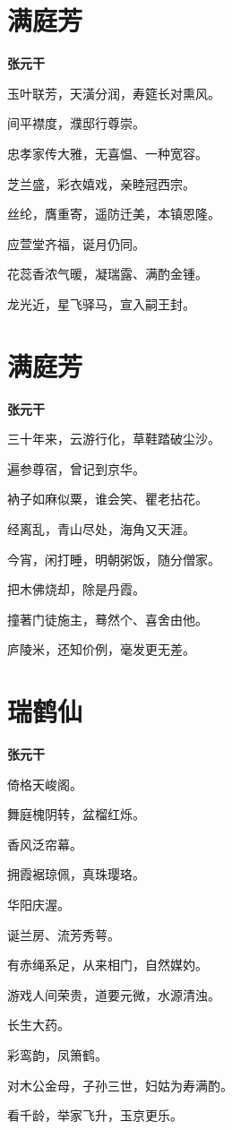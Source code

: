 \documentclass[12pt,a4paper]{ctexbook}
\begin{document}
\section{满庭芳}
\textbf{张元干}\par\vspace{0.5em}
玉叶联芳，天潢分润，寿筵长对熏风。\par
间平襟度，濮邸行尊崇。\par
忠孝家传大雅，无喜愠、一种宽容。\par
芝兰盛，彩衣嬉戏，亲睦冠西宗。\par
丝纶，膺重寄，遥防迁美，本镇恩隆。\par
应萱堂齐福，诞月仍同。\par
花蕊香浓气暖，凝瑞露、满酌金锺。\par
龙光近，星飞驿马，宣入嗣王封。\par

\section{满庭芳}
\textbf{张元干}\par\vspace{0.5em}
三十年来，云游行化，草鞋踏破尘沙。\par
遍参尊宿，曾记到京华。\par
衲子如麻似粟，谁会笑、瞿老拈花。\par
经离乱，青山尽处，海角又天涯。\par
今宵，闲打睡，明朝粥饭，随分僧家。\par
把木佛烧却，除是丹霞。\par
撞著门徒施主，蓦然个、喜舍由他。\par
庐陵米，还知价例，毫发更无差。\par

\section{瑞鹤仙}
\textbf{张元干}\par\vspace{0.5em}
倚格天峻阁。\par
舞庭槐阴转，盆榴红烁。\par
香风泛帘幕。\par
拥霞裾琼佩，真珠璎珞。\par
华阳庆渥。\par
诞兰房、流芳秀萼。\par
有赤绳系足，从来相门，自然媒妁。\par
游戏人间荣贵，道要元微，水源清浊。\par
长生大药。\par
彩鸾韵，凤箫鹤。\par
对木公金母，子孙三世，妇姑为寿满酌。\par
看千龄，举家飞升，玉京更乐。\par
\end{document}

